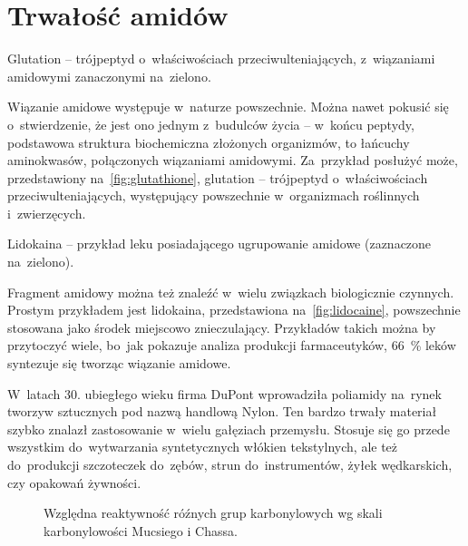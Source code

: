 \section{Trwałość amidów}\label{literature:amide-stability}
\begin{marginfigure}[7\baselineskip]
  
  \caption{
    Glutation \--- trójpeptyd o~właściwościach przeciwulteniających,
    z~wiązaniami amidowymi zanaczonymi na~zielono.
  }
  \label{fig:glutathione}
\end{marginfigure}
Wiązanie amidowe występuje w~naturze powszechnie.
Można nawet pokusić się o~stwierdzenie, że jest ono jednym z~budulców życia \---
  w~końcu peptydy, podstawowa struktura biochemiczna złożonych organizmów,
  to łańcuchy aminokwasów, połączonych wiązaniami amidowymi.
Za~przykład posłużyć może, przedstawiony na~\cref{fig:glutathione}, glutation \---
  trójpeptyd o~właściwościach przeciwulteniających,
  występujący powszechnie w~organizmach roślinnych i~zwierzęcych.
  
\begin{marginfigure}
  
  \caption{
    Lidokaina \--- przykład leku posiadającego ugrupowanie amidowe
    (zaznaczone na~zielono).
  }
  \label{fig:lidocaine}
\end{marginfigure}
Fragment amidowy można też znaleźć w~wielu związkach biologicznie czynnych.
Prostym przykładem jest lidokaina, przedstawiona na~\cref{fig:lidocaine},
  powszechnie stosowana jako środek miejscowo znieczulający.
Przykładów takich można by przytoczyć wiele, bo~jak pokazuje analiza produkcji farmaceutyków,
  \SI{66}{\percent} leków syntezuje się tworząc wiązanie amidowe.

W~latach 30. ubiegłego wieku firma DuPont wprowadziła poliamidy na~rynek tworzyw
  sztucznych pod nazwą handlową Nylon.
Ten bardzo trwały materiał szybko znalazł zastosowanie w~wielu gałęziach przemysłu.
Stosuje się go przede wszystkim do~wytwarzania syntetycznych włókien tekstylnych,
  ale też do~produkcji szczoteczek do~zębów, strun do~instrumentów,
  żyłek wędkarskich, czy opakowań żywności.

\begin{figure}[b]
  \centering
  
  \caption{
    Względna reaktywność róźnych grup karbonylowych
    wg skali karbonylowości Mucsiego i Chassa.
  }
  \label{fig:carbonyl-scale}
\end{figure}

